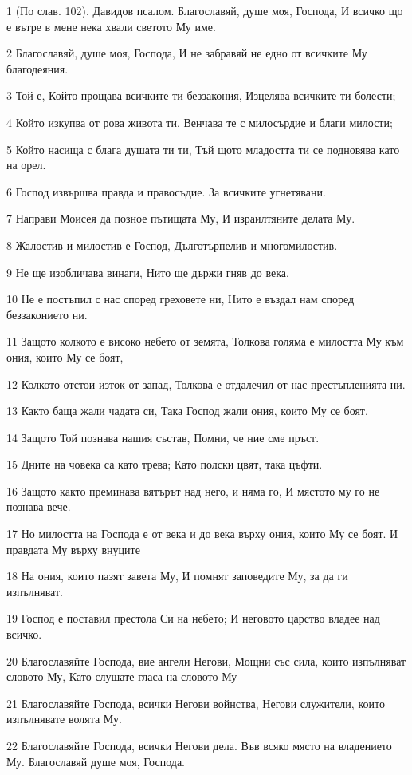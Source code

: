 \par 1 (По слав. 102). Давидов псалом. Благославяй, душе моя, Господа, И всичко що е вътре в мене нека хвали светото Му име.
\par 2 Благославяй, душе моя, Господа, И не забравяй не едно от всичките Му благодеяния.
\par 3 Той е, Който прощава всичките ти беззакония, Изцелява всичките ти болести;
\par 4 Който изкупва от рова живота ти, Венчава те с милосърдие и благи милости;
\par 5 Който насища с блага душата ти ти, Тъй щото младостта ти се подновява като на орел.
\par 6 Господ извършва правда и правосъдие. За всичките угнетявани.
\par 7 Направи Моисея да позное пътищата Му, И израилтяните делата Му.
\par 8 Жалостив и милостив е Господ, Дълготърпелив и многомилостив.
\par 9 Не ще изобличава винаги, Нито ще държи гняв до века.
\par 10 Не е постъпил с нас според греховете ни, Нито е въздал нам според беззаконието ни.
\par 11 Защото колкото е високо небето от земята, Толкова голяма е милостта Му към ония, които Му се боят,
\par 12 Колкото отстои изток от запад, Толкова е отдалечил от нас престъпленията ни.
\par 13 Както баща жали чадата си, Така Господ жали ония, които Му се боят.
\par 14 Защото Той познава нашия състав, Помни, че ние сме пръст.
\par 15 Дните на човека са като трева; Като полски цвят, така цъфти.
\par 16 Защото както преминава вятърът над него, и няма го, И мястото му го не познава вече.
\par 17 Но милостта на Господа е от века и до века върху ония, които Му се боят. И правдата Му върху внуците
\par 18 На ония, които пазят завета Му, И помнят заповедите Му, за да ги изпълняват.
\par 19 Господ е поставил престола Си на небето; И неговото царство владее над всичко.
\par 20 Благославяйте Господа, вие ангели Негови, Мощни със сила, които изпълняват словото Му, Като слушате гласа на словото Му
\par 21 Благославяйте Господа, всички Негови войнства, Негови служители, които изпълнявате волята Му.
\par 22 Благославяйте Господа, всички Негови дела. Във всяко място на владението Му. Благославяй душе моя, Господа.

